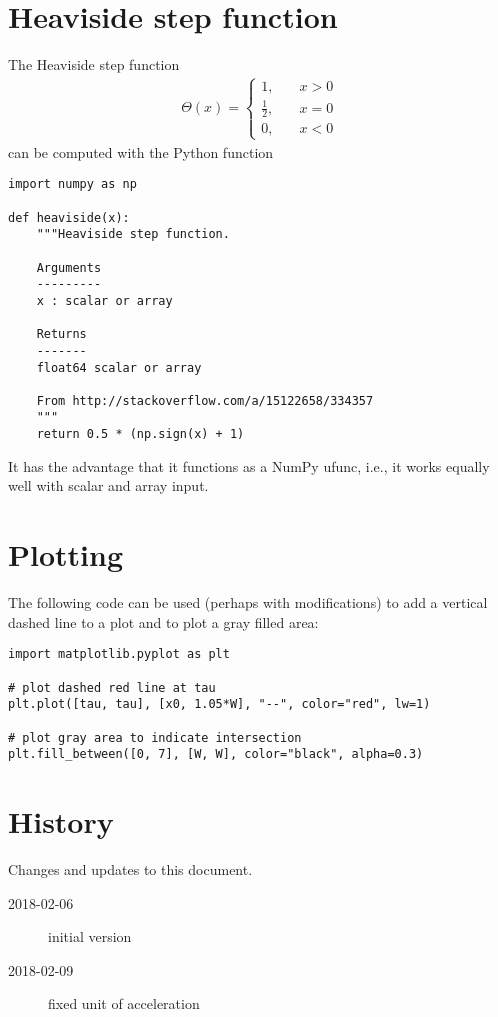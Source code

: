 \documentclass[letterpaper]{scrartcl}
\begin{document}
\appendix{}

\section{Heaviside step function}
\label{sec:heaviside}

The Heaviside step function
\begin{gather}
  \label{eq:heaviside}
  \Theta(x) =
  \begin{cases}
    1,& \quad x > 0\\
    \frac{1}{2},& \quad x = 0\\
    0,& \quad x < 0
  \end{cases}
\end{gather}
can be computed with the Python function
\begin{verbatim}
import numpy as np

def heaviside(x):
    """Heaviside step function.
    
    Arguments
    ---------
    x : scalar or array
    
    Returns
    -------
    float64 scalar or array
    
    From http://stackoverflow.com/a/15122658/334357
    """
    return 0.5 * (np.sign(x) + 1)  
\end{verbatim}
It has the advantage that it functions as a NumPy ufunc, i.e., it
works equally well with scalar and array input.

\section{Plotting}
\label{sec:plot}

The following code can be used (perhaps with modifications) to add a
vertical dashed line to a plot and to plot a gray filled area:
\begin{verbatim}
import matplotlib.pyplot as plt

# plot dashed red line at tau
plt.plot([tau, tau], [x0, 1.05*W], "--", color="red", lw=1)

# plot gray area to indicate intersection
plt.fill_between([0, 7], [W, W], color="black", alpha=0.3)
\end{verbatim}

\section{History}
\label{sec:history}

Changes and updates to this document.
\begin{description}
\item[2018-02-06] initial version
\item[2018-02-09] fixed unit of acceleration
\end{description}
\end{document}
